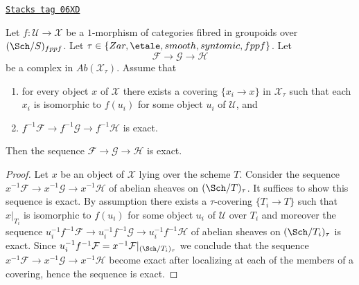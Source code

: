 \begin{lemma}
\label{stacks-sheaves-lemma-check-exactness-covering}
\href{https://stacks.math.columbia.edu/tag/06XD}{\texttt{Stacks tag 06XD}}

Let $f : \mathcal{U} \to \mathcal{X}$ be a $1$-morphism of categories fibred
in groupoids over $(\Sch/S)_{fppf}$. Let
$\tau \in \{Zar, \etale, smooth, syntomic, fppf\}$.
Let
$$
\mathcal{F} \to \mathcal{G} \to \mathcal{H}
$$
be a complex in $\textit{Ab}(\mathcal{X}_\tau)$. Assume that
\begin{enumerate}
\item for every object $x$ of $\mathcal{X}$ there exists a covering
$\{x_i \to x\}$ in $\mathcal{X}_\tau$ such that each $x_i$ is isomorphic
to $f(u_i)$ for some object $u_i$ of $\mathcal{U}$, and
\item $f^{-1}\mathcal{F} \to f^{-1}\mathcal{G} \to f^{-1}\mathcal{H}$ is exact.
\end{enumerate}
Then the sequence $\mathcal{F} \to \mathcal{G} \to \mathcal{H}$
is exact.
\end{lemma}

\begin{proof}
Let $x$ be an object of $\mathcal{X}$ lying over the scheme $T$.
Consider the sequence
$x^{-1}\mathcal{F} \to x^{-1}\mathcal{G} \to x^{-1}\mathcal{H}$
of abelian sheaves on $(\Sch/T)_\tau$. It suffices to show
this sequence is exact. By assumption there exists a $\tau$-covering
$\{T_i \to T\}$ such that $x|_{T_i}$ is isomorphic to $f(u_i)$ for
some object $u_i$ of $\mathcal{U}$ over $T_i$ and moreover the sequence
$u_i^{-1}f^{-1}\mathcal{F} \to u_i^{-1}f^{-1}\mathcal{G} \to
u_i^{-1}f^{-1}\mathcal{H}$ of abelian sheaves on $(\Sch/T_i)_\tau$
is exact. Since
$u_i^{-1}f^{-1}\mathcal{F} = x^{-1}\mathcal{F}|_{(\Sch/T_i)_\tau}$
we conclude that the sequence
$x^{-1}\mathcal{F} \to x^{-1}\mathcal{G} \to x^{-1}\mathcal{H}$
become exact after localizing at each of the members of a covering,
hence the sequence is exact.
\end{proof}


